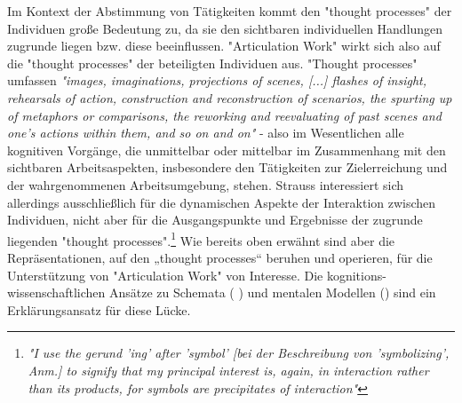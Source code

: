 Im Kontext der Abstimmung von Tätigkeiten kommt den "thought processes" der Individuen große Bedeutung zu, da sie den sichtbaren individuellen Handlungen zugrunde liegen bzw. diese beeinflussen. "Articulation Work" wirkt sich also auf die "thought processes" der beteiligten Individuen aus. "Thought processes" umfassen \emph{"images, imaginations, projections of scenes, [...] flashes of insight, rehearsals of action, construction and reconstruction of scenarios, the spurting up of metaphors or comparisons, the reworking and reevaluating of past scenes and one's actions within them, and so on and on"} \citep[][S. 130]{Strauss93} - also im Wesentlichen alle kognitiven Vorgänge, die unmittelbar oder mittelbar im Zusammenhang mit den sichtbaren Arbeitsaspekten, insbesondere den Tätigkeiten zur Zielerreichung und der wahrgenommenen Arbeitsumgebung, stehen. Strauss interessiert sich allerdings ausschließlich für die dynamischen Aspekte der Interaktion zwischen Individuen, nicht aber für die Ausgangspunkte und Ergebnisse der zugrunde liegenden "thought processes".\footnote{\emph{"I use the gerund 'ing' after 'symbol' [bei der Beschreibung von 'symbolizing', Anm.] to signify that my principal interest is, again, in interaction rather than its products, for symbols are precipitates of interaction"}\citep[][S. 149]{Strauss93}}  Wie bereits oben erwähnt sind aber die Repräsentationen, auf den „thought processes“ beruhen und operieren, für die Unterstützung von "Articulation Work" von Interesse. Die kognitions-wissenschaftlichen Ansätze zu Schemata (\citet{Rumelhart78} \citet[vgl. nach ]{Hanke06}) und mentalen Modellen (\citet[vgl. ]{Seel91}) sind ein Erklärungsansatz für diese Lücke.


